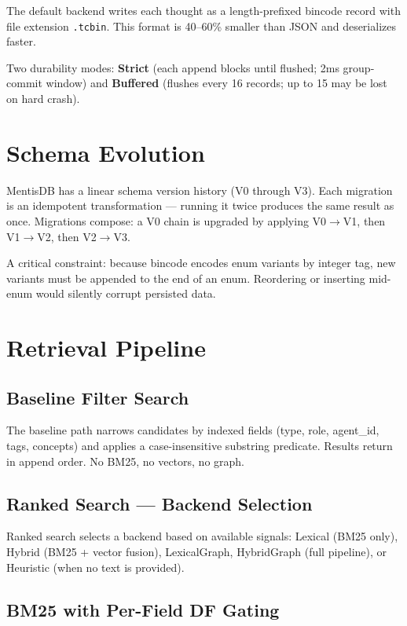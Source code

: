 \documentclass[11pt,a4paper]{article}
\begin{document}
The default backend writes each thought as a length-prefixed bincode record with file
extension \texttt{.tcbin}. This format is 40–60\% smaller than JSON and deserializes faster.

Two durability modes: \textbf{Strict} (each append blocks until flushed; 2ms group-commit
window) and \textbf{Buffered} (flushes every 16 records; up to 15 may be lost on hard crash).

\section{Schema Evolution}

MentisDB has a linear schema version history (V0 through V3). Each migration is an
idempotent transformation — running it twice produces the same result as once. Migrations
compose: a V0 chain is upgraded by applying V0$\to$V1, then V1$\to$V2, then V2$\to$V3.

A critical constraint: because bincode encodes enum variants by integer tag, new variants
must be appended to the end of an enum. Reordering or inserting mid-enum would silently
corrupt persisted data.

\section{Retrieval Pipeline}

\subsection{Baseline Filter Search}

The baseline path narrows candidates by indexed fields (type, role, agent\_id, tags,
concepts) and applies a case-insensitive substring predicate. Results return in append
order. No BM25, no vectors, no graph.

\subsection{Ranked Search — Backend Selection}

Ranked search selects a backend based on available signals: Lexical (BM25 only), Hybrid
(BM25 + vector fusion), LexicalGraph, HybridGraph (full pipeline), or Heuristic (when no
text is provided).

\subsection{BM25 with Per-Field DF Gating}
\end{document}
